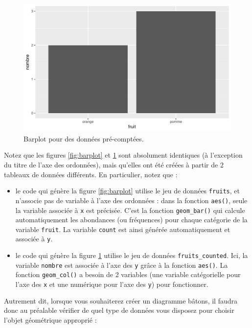 \documentclass[a4paperpaper,]{article}
\providecommand{\tightlist}{%
  \setlength{\itemsep}{0pt}\setlength{\parskip}{0pt}}
\theoremstyle{definition}
\theoremstyle{definition}
\theoremstyle{definition}
\theoremstyle{remark}
\begin{document}
\begin{figure}[htpb]

{\centering \includegraphics[width=0.9\linewidth]{figure/barplotcol-1} 

}

\caption{Barplot pour des données pré-comptées.}\label{fig:barplotcol}
\end{figure}

Notez que les figures \ref{fig:barplot} et \ref{fig:barplotcol} sont
absolument identiques (à l'exception du titre de l'axe des ordonnées),
mais qu'elles ont été créées à partir de 2 tableaux de données
différents. En particulier, notez que :

\begin{itemize}
\tightlist
\item
  le code qui génère la figure \ref{fig:barplot} utilise le jeu de
  données \texttt{fruits}, et n'associe pas de variable à l'axe des
  ordonnées : dans la fonction \texttt{aes()}, seule la variable
  associée à \texttt{x} est précisée. C'est la fonction
  \texttt{geom\_bar()} qui calcule automatiquement les abondances (ou
  fréquences) pour chaque catégorie de la variable \texttt{fruit}. La
  variable \texttt{count} est ainsi générée automatiquement et associée
  à \texttt{y}.
\item
  le code qui génère la figure \ref{fig:barplotcol} utilise le jeu de
  données \texttt{fruits\_counted}. Ici, la variable \texttt{nombre} est
  associée à l'axe des \texttt{y} grâce à la fonction \texttt{aes()}. La
  fonction \texttt{geom\_col()} a besoin de 2 variables (une variable
  catégorielle pour l'axe des \texttt{x} et une numérique pour l'axe des
  \texttt{y}) pour fonctionner.
\end{itemize}

Autrement dit, lorsque vous souhaiterez créer un diagramme bâtons, il
faudra donc au préalable vérifier de quel type de données vous disposez
pour choisir l'objet géométrique approprié :
\end{document}
